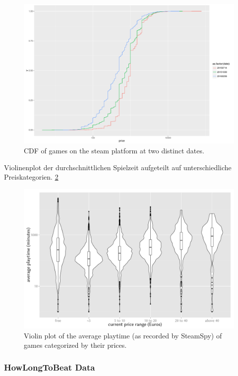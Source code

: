 \begin{figure}[!t]
	\centering
	\includegraphics[width=1.0\columnwidth]{images/steam-prices.pdf}
	\caption{CDF of games on the steam platform at two distinct dates.}
\label{fig:steam-prices}
\end{figure}

Violinenplot der durchschnittlichen Spielzeit aufgeteilt auf unterschiedliche Preiskategorien. \ref{fig:steam-cost-vs-playtime-violin}

\begin{figure}[!t]
	\centering
	\includegraphics[width=1.0\columnwidth]{images/steam-cost-vs-playtime.pdf}
	\caption{Violin plot of the average playtime (as recorded by SteamSpy) of games categorized by their prices.}
\label{fig:steam-cost-vs-playtime-violin}
\end{figure}

\subsubsection{HowLongToBeat Data}

